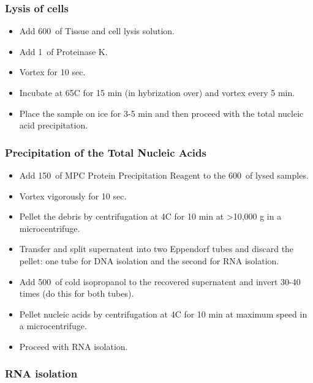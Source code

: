\subsubsection{Lysis of cells}

\begin{itemize}
\item Add 600~\uL of Tissue and cell lysis solution.
\item Add 1~\uL of Proteinase K.
\item Vortex for 10 sec.
\item Incubate at 65\degree C for 15 min (in hybrization over) and vortex every 5 min.
\item Place the sample on ice for 3-5 min and then proceed with the total nucleic acid precipitation.
\end{itemize}

\subsubsection{Precipitation of the Total Nucleic Acids}

\begin{itemize}
\item Add 150~\uL of MPC Protein Precipitation Reagent to the 600~\uL of lysed samples.
\item Vortex vigorously for 10 sec.
\item Pellet the debris by centrifugation at 4\degree C for 10 min at >10,000 g in a microcentrifuge. 
\item Transfer and split supernatent into two Eppendorf tubes and discard the pellet: one tube for DNA isolation and the second for RNA isolation.
\item Add 500~\uL of cold isopropanol to the recovered supernatent and invert 30-40 times (do this for both tubes).
\item Pellet nucleic acids by centrifugation at 4\degree C for 10 min at maximum speed in a microcentrifuge.
\item Proceed with RNA isolation.
\end{itemize}

\subsubsection{RNA isolation}

